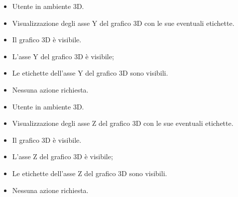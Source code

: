 \UCdsc
    { %
        \begin{itemize}
            \item Utente in ambiente 3D.
        \end{itemize}
    }
    { %
        \begin{itemize}
            \item Visualizzazione degli asse Y del grafico 3D con le sue eventuali etichette.
        \end{itemize}
    }
    { %
        \begin{itemize}
            \item Il grafico 3D è visibile.
        \end{itemize}
    }
    { %
        \begin{itemize}
            \item L'asse Y del grafico 3D è visibile;
            \item Le etichette dell'asse Y del grafico 3D sono visibili.
        \end{itemize}
    }
    { %
        \begin{itemize}
            \item Nessuna azione richiesta.
        \end{itemize}
    }

\UCdsc
    { %
        \begin{itemize}
            \item Utente in ambiente 3D.
        \end{itemize}
    }
    { %
        \begin{itemize}
            \item Visualizzazione degli asse Z del grafico 3D con le sue eventuali etichette.
        \end{itemize}
    }
    { %
        \begin{itemize}
            \item Il grafico 3D è visibile.
        \end{itemize}
    }
    { %
        \begin{itemize}
            \item L'asse Z del grafico 3D è visibile;
            \item Le etichette dell'asse Z del grafico 3D sono visibili.
        \end{itemize}
    }
    { %
        \begin{itemize}
            \item Nessuna azione richiesta.
        \end{itemize}
    }


